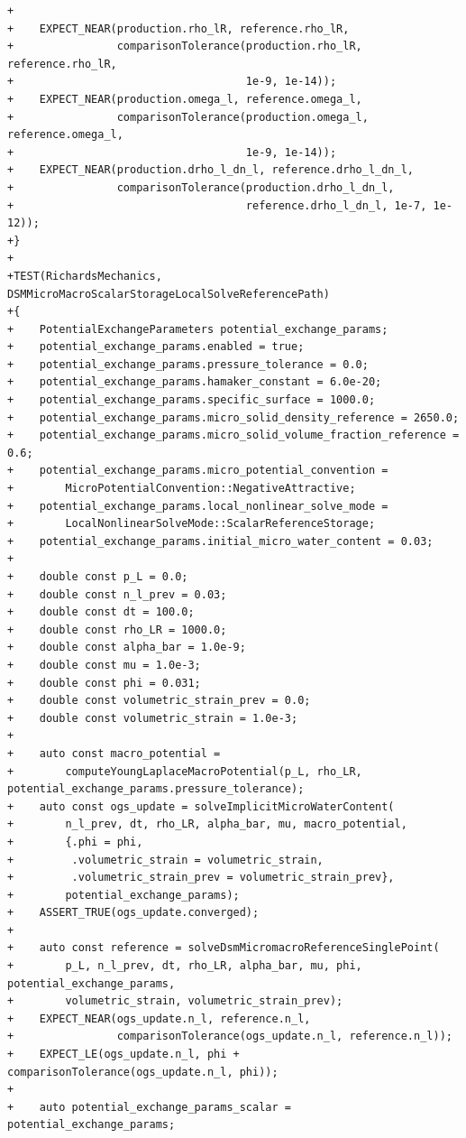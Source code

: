 \documentclass[10pt]{article}
\begin{document}
\begin{lstlisting}
+
+    EXPECT_NEAR(production.rho_lR, reference.rho_lR,
+                comparisonTolerance(production.rho_lR, reference.rho_lR,
+                                    1e-9, 1e-14));
+    EXPECT_NEAR(production.omega_l, reference.omega_l,
+                comparisonTolerance(production.omega_l, reference.omega_l,
+                                    1e-9, 1e-14));
+    EXPECT_NEAR(production.drho_l_dn_l, reference.drho_l_dn_l,
+                comparisonTolerance(production.drho_l_dn_l,
+                                    reference.drho_l_dn_l, 1e-7, 1e-12));
+}
+
+TEST(RichardsMechanics, DSMMicroMacroScalarStorageLocalSolveReferencePath)
+{
+    PotentialExchangeParameters potential_exchange_params;
+    potential_exchange_params.enabled = true;
+    potential_exchange_params.pressure_tolerance = 0.0;
+    potential_exchange_params.hamaker_constant = 6.0e-20;
+    potential_exchange_params.specific_surface = 1000.0;
+    potential_exchange_params.micro_solid_density_reference = 2650.0;
+    potential_exchange_params.micro_solid_volume_fraction_reference = 0.6;
+    potential_exchange_params.micro_potential_convention =
+        MicroPotentialConvention::NegativeAttractive;
+    potential_exchange_params.local_nonlinear_solve_mode =
+        LocalNonlinearSolveMode::ScalarReferenceStorage;
+    potential_exchange_params.initial_micro_water_content = 0.03;
+
+    double const p_L = 0.0;
+    double const n_l_prev = 0.03;
+    double const dt = 100.0;
+    double const rho_LR = 1000.0;
+    double const alpha_bar = 1.0e-9;
+    double const mu = 1.0e-3;
+    double const phi = 0.031;
+    double const volumetric_strain_prev = 0.0;
+    double const volumetric_strain = 1.0e-3;
+
+    auto const macro_potential =
+        computeYoungLaplaceMacroPotential(p_L, rho_LR, potential_exchange_params.pressure_tolerance);
+    auto const ogs_update = solveImplicitMicroWaterContent(
+        n_l_prev, dt, rho_LR, alpha_bar, mu, macro_potential,
+        {.phi = phi,
+         .volumetric_strain = volumetric_strain,
+         .volumetric_strain_prev = volumetric_strain_prev},
+        potential_exchange_params);
+    ASSERT_TRUE(ogs_update.converged);
+
+    auto const reference = solveDsmMicromacroReferenceSinglePoint(
+        p_L, n_l_prev, dt, rho_LR, alpha_bar, mu, phi, potential_exchange_params,
+        volumetric_strain, volumetric_strain_prev);
+    EXPECT_NEAR(ogs_update.n_l, reference.n_l,
+                comparisonTolerance(ogs_update.n_l, reference.n_l));
+    EXPECT_LE(ogs_update.n_l, phi + comparisonTolerance(ogs_update.n_l, phi));
+
+    auto potential_exchange_params_scalar = potential_exchange_params;

\end{lstlisting}
\end{document}
